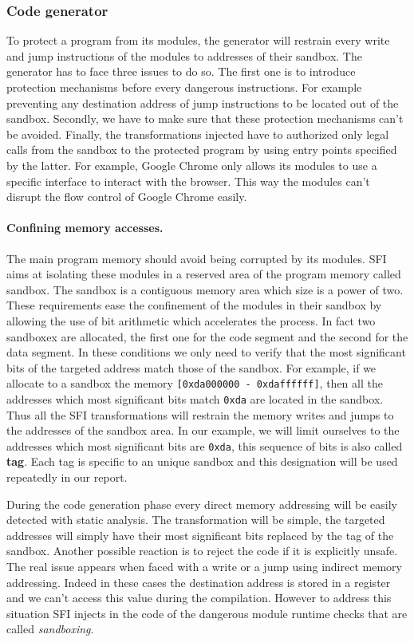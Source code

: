 \documentclass[11pt]{sdm}
\begin{document}
\subsubsection{Code generator}
\label{ssub:Code generator}
To protect a program from its modules, the generator will restrain every write and jump instructions of the modules to addresses of their sandbox.
The generator has to face three issues to do so. The first one is to introduce protection mechanisms before every dangerous instructions. For example preventing any destination address of jump instructions to be located out of the sandbox.
Secondly, we have to make sure that these protection mechanisms can't be avoided. 
Finally, the transformations injected have to authorized only legal calls from the sandbox to the protected program by using entry points specified by the latter. For example, Google Chrome only allows its modules to use a specific interface to interact with the browser. This way the modules can't disrupt the flow control of Google Chrome easily.
\paragraph{Confining memory accesses.}
\label{par:Confining memory accesses}
The main program memory should avoid being corrupted by its modules. SFI aims at isolating these modules in a reserved area of the program memory called sandbox.
The sandbox is a contiguous memory area which size is a power of two. These requirements ease the confinement of the modules in their sandbox by allowing the use of bit arithmetic which accelerates the process.
In fact two sandboxex are allocated, the first one for the code segment and the second for the data segment. In these conditions we only need to verify that the most significant bits of the targeted address match those of the sandbox. For example, if we allocate to a sandbox the memory \texttt{[0xda000000~-~0xdaffffff]}, then all the addresses which most significant bits match \texttt{0xda} are located in the sandbox. Thus all the SFI transformations will restrain the memory writes and jumps to the addresses of the sandbox area. In our example, we will limit ourselves to the addresses which most significant bits are \texttt{0xda}, this sequence of bits is also called \textbf{tag}. Each tag is specific to an unique sandbox and this designation will be used repeatedly in our report. 

During the code generation phase every direct memory addressing will be easily detected with static analysis. 
The transformation will be simple, the targeted addresses will simply have their most significant bits replaced by the tag of the sandbox. Another possible reaction is to reject the code if it is explicitly unsafe. The real issue appears when faced with a write or a jump using indirect memory addressing. Indeed in these cases the destination address is stored in a register and we can't access this value during the compilation. However to address this situation SFI injects in the code of the dangerous module runtime checks that are called \textit{sandboxing}.
\end{document}
